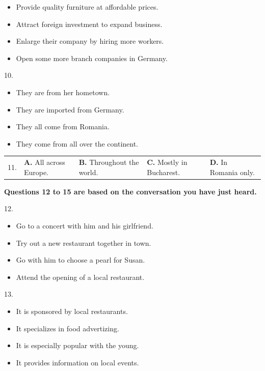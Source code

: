 \documentclass[UTF8,11pt]{ctexart}
\begin{document}
\begin{itemize}[leftmargin=2em,itemsep=.2em,topsep=.4em]\item[A.] Provide quality furniture at affordable prices.
\item[B.] Attract foreign investment to expand business.
\item[C.] Enlarge their company by hiring more workers.
\item[D.] Open some more branch companies in Germany.
\end{itemize}

10.


\begin{itemize}[leftmargin=2em,itemsep=.2em,topsep=.4em]\item[A.] They are from her hometown.
\item[B.] They are imported from Germany.
\item[C.] They all come from Romania.
\item[D.] They come from all over the continent.
\end{itemize}

\noindent\begin{tabularx}{\linewidth}{@{}lXXXX@{}}11. & \textbf{A.} All across Europe. & \textbf{B.} Throughout the world. & \textbf{C.} Mostly in Bucharest. & \textbf{D.} In Romania only.\\\end{tabularx}\par

\textbf{Questions 12 to 15 are based on the conversation you have just heard.}


12.


\begin{itemize}[leftmargin=2em,itemsep=.2em,topsep=.4em]\item[A.] Go to a concert with him and his girlfriend.
\item[B.] Try out a new restaurant together in town.
\item[C.] Go with him to choose a pearl for Susan.
\item[D.] Attend the opening of a local restaurant.
\end{itemize}

13.


\begin{itemize}[leftmargin=2em,itemsep=.2em,topsep=.4em]\item[A.] It is sponsored by local restaurants.
\item[B.] It specializes in food advertizing.
\item[C.] It is especially popular with the young.
\item[D.] It provides information on local events.
\end{itemize}
\end{document}
